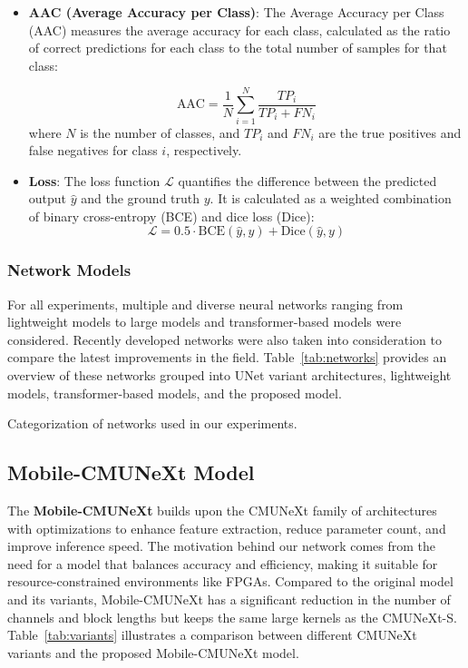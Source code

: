 \documentclass[lettersize,journal]{IEEEtran}
\begin{document}
\begin{itemize}
    \item \textbf{AAC (Average Accuracy per Class)}: The Average Accuracy per Class (AAC) measures the average accuracy for each class, calculated as the ratio of correct predictions for each class to the total number of samples for that class:

    \[
    \text{AAC} = \frac{1}{N} \sum_{i=1}^{N} \frac{TP_i}{TP_i + FN_i}
    \]
    where \( N \) is the number of classes, and \( TP_i \) and \( FN_i \) are the true positives and false negatives for class \( i \), respectively.

    \item \textbf{Loss}: The loss function \(\mathcal{L}\) quantifies the difference between the predicted output \(\hat{y}\) and the ground truth \(y\). It is calculated as a weighted combination of binary cross-entropy (BCE) and dice loss (Dice):
    \begin{equation}
        \mathcal{L} = 0.5 \cdot \text{BCE}(\hat{y}, y) + \text{Dice}(\hat{y}, y)
    \end{equation}

\end{itemize}



\subsubsection{Network Models}
For all experiments, multiple and diverse neural networks ranging from lightweight models to large models and transformer-based models were considered. Recently developed networks were also taken into consideration to compare the latest improvements in the field. Table~\ref{tab:networks} provides an overview of these networks grouped into UNet variant architectures, lightweight models, transformer-based models, and the proposed model.


\begin{table}[ht]
    \centerline{}
\caption{Categorization of networks used in our experiments.}
\label{tab:networks}
\end{table}

\subsection{Mobile-CMUNeXt Model}
The \textbf{Mobile-CMUNeXt} builds upon the CMUNeXt family of architectures with optimizations to enhance feature extraction, reduce parameter count, and improve inference speed. The motivation behind our network comes from the need for a model that balances accuracy and efficiency, making it suitable for resource-constrained environments like FPGAs. Compared to the original model and its variants, Mobile-CMUNeXt has a significant reduction in the number of channels and block lengths but keeps the same large kernels as the CMUNeXt-S. Table~\ref{tab:variants} illustrates a comparison between different CMUNeXt variants and the proposed Mobile-CMUNeXt model.
\end{document}
